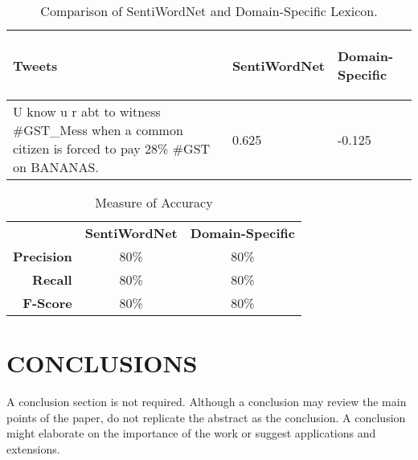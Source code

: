 \documentclass[a4paper, 10pt, conference]{ieeeconf}      %
\begin{document}
\begin{table}[h!]
	\caption{Comparison of SentiWordNet and Domain-Specific Lexicon.}
	\label{table_example}
		\begin{tabular}{|L{3cm}|C{2cm}|R{1.5cm}|}
			\hline
		\begin{center}
			\textbf{Tweets}
		\end{center}&\begin{center}	\textbf{SentiWordNet}\end{center}&\begin{center}\textbf{Domain-Specific}\end{center} \\
			\hline
		U know u r abt to witness \#GST\_Mess when a common citizen is forced to pay 28\% \#GST on BANANAS. &0.625 & -0.125\\
		\hline
		
		\end{tabular}
\end{table}
\begin{table}[h!]
		\caption{Measure of Accuracy}
	\label{table 2}
	\begin{tabular}{ r|c|c| }
		\multicolumn{1}{r}{}
		&  \multicolumn{1}{c}{\textbf{SentiWordNet}}
		& \multicolumn{1}{c}{\textbf{Domain-Specific}} \\
		\cline{2-3}
		\textbf{Precision} & 80\% & 80\% \\
		\cline{2-3}
		\textbf{Recall} & 80\% & 80\% \\
		\cline{2-3}
		\textbf{F-Score} & 80\% & 80\% \\
		\cline{2-3}
	\end{tabular}
	
\end{table}


\section{CONCLUSIONS}

A conclusion section is not required. Although a conclusion may review the main points of the paper, do not replicate the abstract as the conclusion. A conclusion might elaborate on the importance of the work or suggest applications and extensions. 

\addtolength{\textheight}{-12cm}   %
\end{document}
